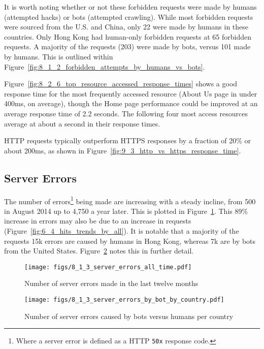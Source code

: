 \documentclass[12pt,titlepage]{article}
\begin{document}
It is worth noting whether or not these forbidden requests were made by humans (attempted hacks) or bots (attempted crawling). While most forbidden requests were sourced from the U.S. and China, only 22 were made by humans in these countries. Only Hong Kong had human-only forbidden requests at 65 forbidden requests. A majority of the requests (203) were made by bots, versus 101 made by humans. This is outlined within Figure~\ref{fig:8_1_2_forbidden_attempts_by_humans_vs_bots}.

Figure~\ref{fig:8_2_6_top_resource_accessed_response_times} shows a good response time for the most frequently accessed resource (About Us page in under 400ms, on average), though the Home page performance could be improved at an average response time of 2.2 seconds. The following four most access resources average at about a second in their response times.

HTTP requests typically outperform HTTPS responses by a fraction of 20\% or about 200ms, as shown in Figure~\ref{fig:9_3_http_vs_https_response_time}.

\subsection{Server Errors}
\label{ssub:server_errors}
The number of errors\footnote{Where a server error is defined as a HTTP \texttt{50x} response code.} being made are increasing with a steady incline, from 500 in August 2014 up to 4,750 a year later. This is plotted in Figure~\ref{fig:8_1_3_server_errors_all_time}. This 89\% increase in errors may also be due to an increase in requests (Figure~\ref{fig:6_4_hits_trends_by_all}). It is notable that a majority of the requests 15k errors are caused by humans in Hong Kong, whereas 7k are by bots from the United States. Figure~\ref{fig:8_1_3_server_errors_by_bot_by_country} notes this in further detail.

\begin{figure}[thbp]
  \centering
  \texttt{[image: figs/8\_1\_3\_server\_errors\_all\_time.pdf]}
  \caption{Number of server errors made in the last twelve months}
  \label{fig:8_1_3_server_errors_all_time}
\end{figure}

\begin{figure}[thbp]
  \centering
  \texttt{[image: figs/8\_1\_3\_server\_errors\_by\_bot\_by\_country.pdf]}
  \caption{Number of server errors caused by bots versus humans per country}
  \label{fig:8_1_3_server_errors_by_bot_by_country}
\end{figure}
\end{document}
